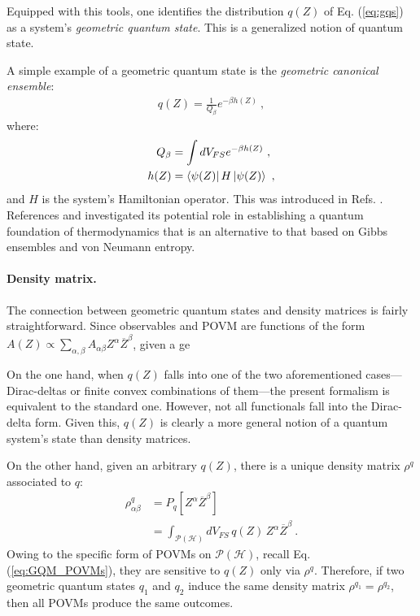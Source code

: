 \documentclass[draft,nofootinbib,pre,twocolumn,showpacs,showkeys,preprintnumbers,floatfix]{revtex4-1}
\newcommand{\1}{\mathbbm{1}}
\newcommand{\intP}{\int_{\mathcal{P}(\mathcal{H})} \!\!\!\!\!\!\!\!\!}
\begin{document}
Equipped with this tools, one identifies the distribution $q(Z)$ of Eq.
(\ref{eq:gqs}) as a system's \emph{geometric quantum state}. This is a
generalized notion of quantum state.

A simple example of a geometric quantum state is the 
\emph{geometric canonical ensemble}:
\begin{align*}
q(Z) = \frac{1}{Q_\beta} e^{-\beta h(Z)}
  ~,
\end{align*}
where:
\begin{align*}
  Q_\beta & = \int dV_{FS} e^{-\beta h(Z)} ~, \\
  h(Z) & = \bra{\psi(Z)}H\ket{\psi(Z)} ~,
\end{align*}
and $H$ is the system's Hamiltonian operator. This was introduced in 
Refs. \cite{Brody1998}. References \cite{Brody2016} and \cite{Anza20b} 
investigated its potential role in establishing a quantum foundation of
thermodynamics that is an alternative to that based on Gibbs ensembles and von
Neumann entropy. 

\paragraph*{Density matrix.}
The connection between geometric quantum states and density matrices is
fairly straightforward. Since observables and POVM are functions of the 
form $A(Z) \propto \sum_{\alpha,\beta}A_{\alpha \beta} Z^\alpha \overline{Z}^\beta$, 
given a ge 

 On the one hand, when $q(Z)$ falls into one of the
two aforementioned cases---Dirac-deltas or finite convex combinations of
them---the present formalism is equivalent to the standard one. However, not
all functionals fall into the Dirac-delta form. Given this, $q(Z)$ is clearly a
more general notion of a quantum system's state than density matrices.

On the other hand, given an arbitrary $q(Z)$, there is a unique
density matrix $\rho^{q}$ associated to $q$:
\begin{align}
\rho^q_{\alpha \beta} & = P_q[Z^\alpha \overline{Z}^\beta] \nonumber \\
  & = \intP dV_{FS} \, q(Z)  \, Z^\alpha \overline{Z}^\beta
  ~.
\label{eq:densitymatrix}
\end{align}
Owing to the specific form of POVMs on $\mathcal{P}(\mathcal{H})$, recall Eq. (\ref{eq:GQM_POVMs}), they
are sensitive to $q(Z)$ only via $\rho^q$. Therefore, if two geometric quantum states 
$q_1$ and $q_2$ induce the same density matrix $\rho^{q_1} = \rho^{q_2}$, then all POVMs
produce the same outcomes.
\end{document}
